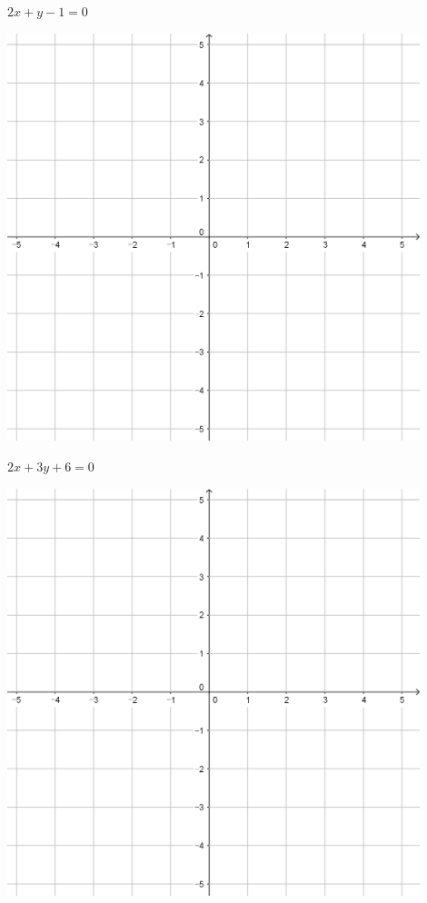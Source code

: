 \documentclass{oblivoir}
\begin{document}
\clearpage
\begin{minipage}{0.45\textwidth}\centering
\(2x+y-1=0\)
\par\bigskip\includegraphics[width=0.9\textwidth]{55}
\end{minipage}
\begin{minipage}{0.45\textwidth}\centering
\(2x+3y+6=0\)
\par\bigskip\includegraphics[width=0.9\textwidth]{55}
\end{minipage}\bigskip\bigskip\par
\end{document}
